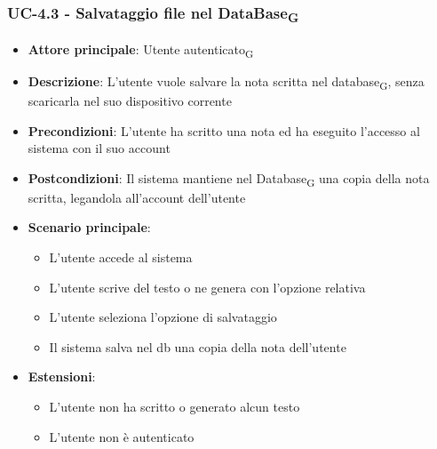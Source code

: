 \documentclass[11pt,a4paper]{article}
\newcommand{\gls}[1]{#1\textsubscript{G}}
\begin{document}
\subsubsection{UC-4.3 - Salvataggio file nel \gls{DataBase}}
\begin{itemize}
    \item \textbf{Attore principale}: \gls{Utente autenticato}
    \item \textbf{Descrizione}: L'utente vuole salvare la nota scritta nel \gls{database}, senza scaricarla nel suo dispositivo corrente
    \item \textbf{Precondizioni}: L'utente ha scritto una nota ed ha eseguito l'accesso al sistema con il suo account
    \item \textbf{Postcondizioni}: Il sistema mantiene nel \gls{Database} una copia della nota scritta, legandola all'account dell'utente
    \item \textbf{Scenario principale}:
        \begin{itemize}
            \item L'utente accede al sistema
            \item L'utente scrive del testo o ne genera con l'opzione relativa
            \item L'utente seleziona l'opzione di salvataggio
            \item Il sistema salva nel db una copia della nota dell'utente
        \end{itemize}
    \item \textbf{Estensioni}:
        \begin{itemize}
            \item L'utente non ha scritto o generato alcun testo
            \item L'utente non è autenticato
        \end{itemize}
\end{itemize}
\end{document}
